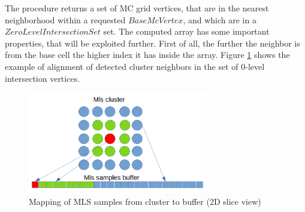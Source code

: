 The procedure returns a set of MC grid vertices, that are in the nearest neighborhood within a requested $BaseMcVertex$, and which are in a $ZeroLevelIntersectionSet$ set. The computed array has some important properties, that will be exploited further. First of all, the further the neighbor is from the base cell the higher index it has inside the array. Figure \ref{fig:mls_neighbor_alignment} shows the example of alignment of detected cluster neighbors in the set of 0-level intersection vertices.\\
\begin{figure}[h]
	\begin{center}
		\includegraphics[width=0.7\textwidth]{figures/MlsSamplesBufferAlignment.png}
	\end{center}
	\caption{Mapping of MLS samples from cluster to buffer (2D slice view)} \label{fig:mls_neighbor_alignment}
\end{figure}
